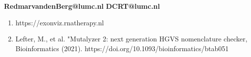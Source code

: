 \documentclass[portrait,a0paper,fontscale=0.31]{baposter}
\begin{document}
\begin{poster}
  {
  \vspace{2.5em}
  \begin{center}
  \textbf{RedmarvandenBerg@lumc.nl}\linebreak
  \newline
  \textbf{DCRT@lumc.nl}\linebreak
  \end{center}
  }

   {
    \begin{enumerate}[itemsep=-0.3ex,leftmargin=0.29cm]
      \item https://exonviz.rnatherapy.nl
      \item Lefter, M., et al. "Mutalyzer 2: next generation HGVS nomenclature checker, Bioinformatics (2021). https://doi.org/10.1093/bioinformatics/btab051
    \end{enumerate}
  }



\end{poster}
\end{document}
